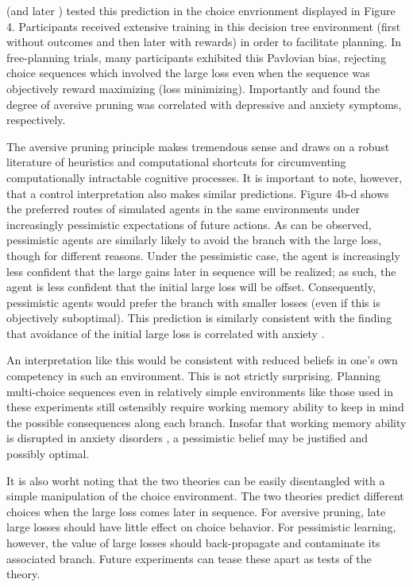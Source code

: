 \documentclass[11pt]{article} %
\begin{document}
\cite{Huys2012} (and later \cite{Lally2017}) tested this prediction in the
choice envrionment displayed in Figure 4. Participants received extensive training
in this decision tree environment (first without outcomes and then later with
rewards) in order to facilitate planning. In free-planning trials, many participants
exhibited this Pavlovian bias, rejecting choice sequences which involved the large
loss even when the sequence was objectively reward maximizing (loss minimizing).
Importantly \cite{Huys2012} and \cite{Lally2017} found the degree of aversive
pruning was correlated with depressive and anxiety symptoms, respectively.

The aversive pruning principle makes tremendous sense and draws on a robust literature
of heuristics and computational shortcuts for circumventing computationally intractable
cognitive processes. It is important to note, however, that a control interpretation
also makes similar predictions. Figure 4b-d shows the preferred routes of simulated
agents in the same environments under increasingly pessimistic expectations of
future actions. As can be observed, pessimistic agents are similarly likely to avoid
the branch with the large loss, though for different reasons. Under the pessimistic case,
the agent is increasingly less confident that the large gains later in
sequence will be realized; as such, the agent is less confident that the initial
large loss will be offset. Consequently, pessimistic agents would prefer the branch
with smaller losses (even if this is objectively suboptimal). This prediction
is similarly consistent with the finding that avoidance of the initial large loss
is correlated with anxiety \cite{Lally2017}.

An interpretation like this would be consistent with reduced beliefs in one's
own competency in such an environment. This is not strictly surprising. Planning
multi-choice sequences even in relatively simple environments like those used
in these experiments still ostensibly require working memory ability to keep in
mind the possible consequences along each branch. Insofar that working memory
ability is disrupted in anxiety disorders \citep{Moran2016}, a pessimistic belief
may be justified and possibly optimal.

It is also worht noting that the two theories can be easily disentangled with a
simple manipulation of the choice environment. The two theories predict
different choices when the large loss comes later in sequence. For aversive pruning,
late large losses should have little effect on choice behavior. For pessimistic
learning, however, the value of large losses should back-propagate and contaminate
its associated branch. Future experiments can tease these apart as tests of the theory.
\end{document}

